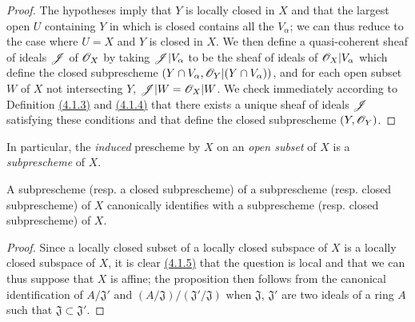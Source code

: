 \begin{proof}
\label{proof-1.4.1.5}
The hypotheses imply that $Y$ is locally closed in $X$ and that the largest open $U$
containing $Y$ in which is closed contains all the $V_\alpha$; we can thus reduce to the case
where $U=X$ and $Y$ is closed in $X$. We then define a quasi-coherent sheaf of ideals
$\mathscr{J}$ of $\mathscr{O}_X$ by taking $\mathscr{J}|V_\alpha$ to be the sheaf of ideals of $\mathscr{O}_X|V_\alpha$
which define the closed subprescheme $(Y\cap V_\alpha,\mathscr{O}_Y|(Y\cap V_\alpha))$, and for each
open subset $W$ of $X$ not intersecting $Y$, $\mathscr{J}|W=\mathscr{O}_X|W$. We check immediately
according to Definition \hyperref[1.4.1.3]{(4.1.3)} and \hyperref[1.4.1.4]{(4.1.4)}
that there exists a unique sheaf of ideals $\mathscr{J}$ satisfying these conditions and that
define the closed subprescheme $(Y,\mathscr{O}_Y)$.
\end{proof}

In particular, the {\em induced} prescheme by $X$ on an {\em open subset} of $X$ is a
{\em subprescheme} of $X$.

\begin{prop}[4.1.6]
\label{1.4.1.6}
A subprescheme (resp. a closed subprescheme) of a subprescheme
(resp. closed subprescheme) of $X$ canonically identifies with a subprescheme
(resp. closed subprescheme) of $X$.
\end{prop}

\begin{proof}
\label{proof-1.4.1.6}
Since a locally closed subset of a locally closed subspace of $X$ is a locally closed
subspace of $X$, it is clear \hyperref[1.4.1.5]{(4.1.5)} that the question is local
and that we can thus suppose that $X$ is affine; the proposition then follows from the
canonical identification of $A/\mathfrak{J}'$ and
$(A/\mathfrak{J})/(\mathfrak{J}'/\mathfrak{J})$ when $\mathfrak{J}$, $\mathfrak{J}'$ are
two ideals of a ring $A$ such that $\mathfrak{J}\subset\mathfrak{J}'$.
\end{proof}


